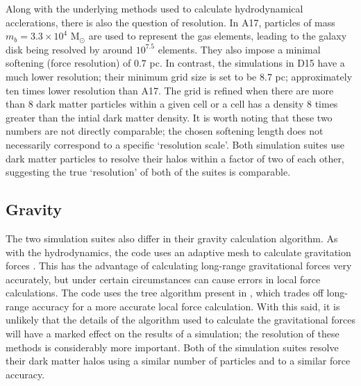 Along with the underlying methods used to calculate hydrodynamical
acclerations, there is also the question of resolution. In A17, particles of
mass $m_b = 3.3\times10^4$ M$_\odot$ are used to represent the gas elements,
leading to the galaxy disk being resolved by around $10^{7.5}$ elements. They
also impose a minimal softening (force resolution) of $0.7$ pc. In contrast,
the simulations in D15 have a much lower resolution; their minimum grid size is
set to be $8.7$ pc; approximately ten times lower resolution than A17. The grid
is refined when there are more than 8 dark matter particles within a given cell
or a cell has a density 8 times greater than the intial dark matter density.
It is worth noting that these two numbers are not directly comparable; the 
chosen softening length does not necessarily correspond to a specific
`resolution scale'. Both simulation suites use dark matter particles to resolve
their halos within a factor of two of each other, suggesting the true
`resolution' of both of the suites is comparable.

\subsection{Gravity}

The two simulation suites also differ in their gravity calculation algorithm.
As with the hydrodynamics, the \hagn{} code uses an adaptive mesh to calculate
gravitation forces \citep[a `particle-mesh' method, based
on][]{kravtsov_adaptive_1997}. This has the advantage of calculating long-range
gravitational forces very accurately, but under certain circumstances can cause
errors in local force calculations. The \fire{} code uses the tree algorithm
present in \citet{springel_cosmological_2005}, which trades off long-range
accuracy for a more accurate local force calculation. With this said, it is
unlikely that the details of the algorithm used to calculate the gravitational
forces will have a marked effect on the results of a simulation; the resolution
of these methods is considerably more important. Both of the simulation suites
resolve their dark matter halos using a similar number of particles and to a
similar force accuracy.

\renewcommand{\arraystretch}{2}

